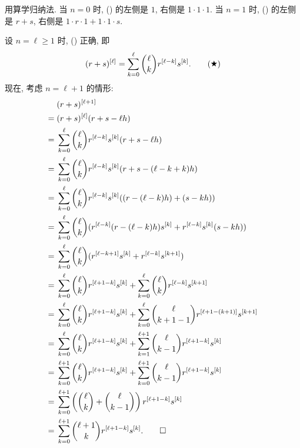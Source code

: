 \begin{pf}
    用算学归纳法. 当 $n = 0$ 时, () 的左侧是 $1$, 右侧是 $1 \cdot 1 \cdot 1$. 当 $n = 1$ 时, () 的左侧是 $r + s$, 右侧是 $1 \cdot r \cdot 1 + 1 \cdot 1 \cdot s$.

    设 $n = \ell \geq 1$ 时, () 正确, 即
    \begin{align*}
        (r + s)^{[\ell]} = \sum_{k = 0}^{\ell} \binom{\ell}{k} r^{[\ell - k]} s^{[k]}. \tag*{(\ding{72})}
    \end{align*}
    现在, 考虑 $n = \ell + 1$ 的情形:
    \begin{align*}
             & (r + s)^{[\ell + 1]}                                                                                                                              \\
        = {} & (r + s)^{[\ell]} (r + s - \ell h)                                                                                                                 \\
        = {} & \sum_{k = 0}^{\ell} \binom{\ell}{k} r^{[\ell - k]} s^{[k]} (r + s - \ell h)                                                                       \\
        = {} & \sum_{k = 0}^{\ell} \binom{\ell}{k} r^{[\ell - k]} s^{[k]} (r + s - (\ell - k + k) h)                                                             \\
        = {} & \sum_{k = 0}^{\ell} \binom{\ell}{k} r^{[\ell - k]} s^{[k]} ((r - (\ell - k) h) + (s - k h))                                                       \\
        = {} & \sum_{k = 0}^{\ell} \binom{\ell}{k} (r^{[\ell - k]} (r - (\ell - k) h) s^{[k]} + r^{[\ell - k]} s^{[k]} (s - k h))                                \\
        = {} & \sum_{k = 0}^{\ell} \binom{\ell}{k} (r^{[\ell - k + 1]} s^{[k]} + r^{[\ell - k]} s^{[k + 1]})                                                     \\
        = {} & \sum_{k = 0}^{\ell} \binom{\ell}{k} r^{[\ell + 1 - k]} s^{[k]} + \sum_{k = 0}^{\ell} \binom{\ell}{k} r^{[\ell - k]} s^{[k + 1]}                   \\
        = {} & \sum_{k = 0}^{\ell} \binom{\ell}{k} r^{[\ell + 1 - k]} s^{[k]} + \sum_{k = 0}^{\ell} \binom{\ell}{k + 1 - 1} r^{[\ell + 1 - (k + 1)]} s^{[k + 1]} \\
        = {} & \sum_{k = 0}^{\ell} \binom{\ell}{k} r^{[\ell + 1 - k]} s^{[k]} + \sum_{k = 1}^{\ell + 1} \binom{\ell}{k - 1} r^{[\ell + 1 - k]} s^{[k]}           \\
        = {} & \sum_{k = 0}^{\ell + 1} \binom{\ell}{k} r^{[\ell + 1 - k]} s^{[k]} + \sum_{k = 0}^{\ell + 1} \binom{\ell}{k - 1} r^{[\ell + 1 - k]} s^{[k]}       \\
        = {} & \sum_{k = 0}^{\ell + 1} \left( \binom{\ell}{k} + \binom{\ell}{k - 1} \right) r^{[\ell + 1 - k]} s^{[k]}                                           \\
        = {} & \sum_{k = 0}^{\ell + 1} \binom{\ell + 1}{k} r^{[\ell + 1 - k]} s^{[k]}. \qedhere
    \end{align*}
\end{pf}

